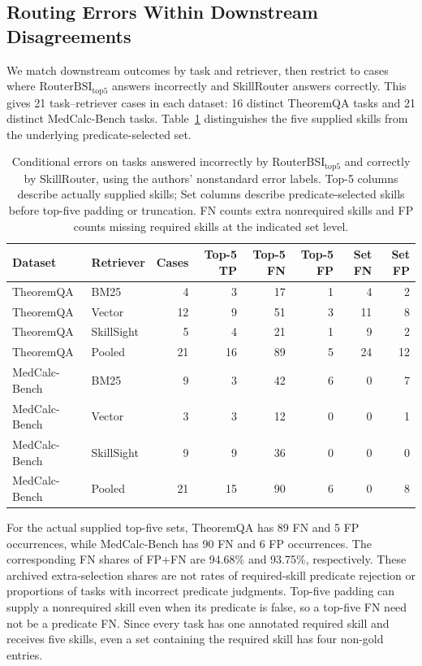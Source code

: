 \subsection{Routing Errors Within Downstream Disagreements}
We match downstream outcomes by task and retriever, then restrict to cases where $\mathrm{RouterBSI}_{\mathrm{top}5}$ answers incorrectly and SkillRouter answers correctly. This gives 21 task--retriever cases in each dataset: 16 distinct TheoremQA tasks and 21 distinct MedCalc-Bench tasks. Table~\ref{tab:app-conditional-errors} distinguishes the five supplied skills from the underlying predicate-selected set.

\begin{table}[t]
\centering
\small
\begin{tabular}{llrrrrrr}
\toprule
Dataset & Retriever & Cases & Top-5 TP & Top-5 FN & Top-5 FP & Set FN & Set FP \\
\midrule
TheoremQA & BM25 & 4 & 3 & 17 & 1 & 4 & 2 \\
TheoremQA & Vector & 12 & 9 & 51 & 3 & 11 & 8 \\
TheoremQA & SkillSight & 5 & 4 & 21 & 1 & 9 & 2 \\
TheoremQA & Pooled & 21 & 16 & 89 & 5 & 24 & 12 \\
MedCalc-Bench & BM25 & 9 & 3 & 42 & 6 & 0 & 7 \\
MedCalc-Bench & Vector & 3 & 3 & 12 & 0 & 0 & 1 \\
MedCalc-Bench & SkillSight & 9 & 9 & 36 & 0 & 0 & 0 \\
MedCalc-Bench & Pooled & 21 & 15 & 90 & 6 & 0 & 8 \\
\bottomrule
\end{tabular}
\caption{Conditional errors on tasks answered incorrectly by RouterBSI$_{\mathrm{top}5}$ and correctly by SkillRouter, using the authors' nonstandard error labels. Top-5 columns describe actually supplied skills; Set columns describe predicate-selected skills before top-five padding or truncation. FN counts extra nonrequired skills and FP counts missing required skills at the indicated set level.}
\label{tab:app-conditional-errors}
\end{table}

For the actual supplied top-five sets, TheoremQA has 89 FN and 5 FP occurrences, while MedCalc-Bench has 90 FN and 6 FP occurrences. The corresponding FN shares of FP+FN are 94.68\% and 93.75\%, respectively. These archived extra-selection shares are not rates of required-skill predicate rejection or proportions of tasks with incorrect predicate judgments. Top-five padding can supply a nonrequired skill even when its predicate is false, so a top-five FN need not be a predicate FN. Since every task has one annotated required skill and receives five skills, even a set containing the required skill has four non-gold entries.

